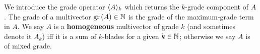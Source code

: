 \begin{definition}[Grade]
	We introduce the grade operator $\langle A \rangle_{k}$ which returns the $k$-grade component of $A$.
	The grade of a multivector $\mathrm{gr}\left(A\right) \in \mathbb{N}$ is the grade of the maximum-grade term in $A$.
	We say $A$ is a \textbf{homogeneous} multivector of grade $k$ (and sometimes denote it $A_k$) iff it is a sum of $k$-blades for a given $k \in \mathbb{N}$; otherwise we say $A$ is of mixed grade.
\end{definition}
